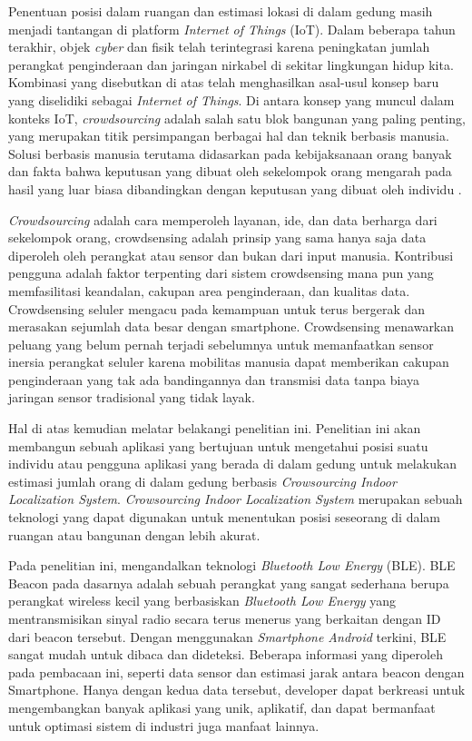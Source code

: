 \par Penentuan posisi dalam ruangan dan estimasi lokasi di dalam gedung masih menjadi tantangan di platform \textit{Internet of Things} (IoT). Dalam beberapa tahun terakhir, objek \textit{cyber} dan fisik telah terintegrasi karena peningkatan jumlah perangkat penginderaan dan jaringan nirkabel di sekitar lingkungan hidup kita. Kombinasi yang disebutkan di atas telah menghasilkan asal-usul konsep baru yang diselidiki sebagai \textit{Internet of Things}. Di antara konsep yang muncul dalam konteks IoT, \textit{crowdsourcing} adalah salah satu blok bangunan yang paling penting, yang merupakan titik persimpangan berbagai hal dan teknik berbasis manusia. Solusi berbasis manusia terutama didasarkan pada kebijaksanaan orang banyak dan fakta bahwa keputusan yang dibuat oleh sekelompok orang mengarah pada hasil yang luar biasa dibandingkan dengan keputusan yang dibuat oleh individu \citep{Sun2019}.

\par \textit{Crowdsourcing} adalah cara memperoleh layanan, ide, dan data berharga dari sekelompok orang, crowdsensing adalah prinsip yang sama hanya saja data diperoleh oleh perangkat atau sensor dan bukan dari input manusia. Kontribusi pengguna adalah faktor terpenting dari sistem crowdsensing mana pun yang memfasilitasi keandalan, cakupan area penginderaan, dan kualitas data. Crowdsensing seluler mengacu pada kemampuan untuk terus bergerak dan merasakan sejumlah data  besar dengan smartphone. Crowdsensing menawarkan peluang yang belum pernah terjadi sebelumnya untuk memanfaatkan sensor inersia perangkat seluler karena mobilitas manusia dapat memberikan cakupan penginderaan yang tak ada bandingannya dan transmisi data tanpa biaya jaringan sensor tradisional yang tidak layak.

\par Hal di atas kemudian melatar belakangi penelitian ini. Penelitian ini akan membangun sebuah aplikasi yang bertujuan untuk mengetahui posisi suatu individu atau pengguna aplikasi yang berada di dalam gedung untuk melakukan estimasi jumlah orang di dalam gedung berbasis \textit{Crowsourcing Indoor Localization System}. \textit{Crowsourcing Indoor Localization System} merupakan   sebuah   teknologi   yang   dapat digunakan  untuk  menentukan  posisi  seseorang  di  dalam  ruangan  atau  bangunan dengan lebih akurat.

\par Pada penelitian ini, mengandalkan teknologi  \textit{Bluetooth Low Energy} (BLE).  BLE Beacon pada dasarnya adalah sebuah perangkat yang sangat sederhana berupa perangkat wireless kecil yang berbasiskan \textit{Bluetooth Low Energy} yang mentransmisikan sinyal radio secara terus menerus yang berkaitan dengan ID dari beacon tersebut. Dengan menggunakan \textit{Smartphone Android} terkini, BLE sangat mudah untuk dibaca dan dideteksi. Beberapa informasi yang diperoleh pada pembacaan ini, seperti data sensor dan estimasi jarak antara beacon dengan Smartphone. Hanya dengan kedua data tersebut, developer dapat berkreasi untuk mengembangkan banyak aplikasi yang unik, aplikatif, dan dapat bermanfaat untuk optimasi sistem di industri juga manfaat lainnya.

